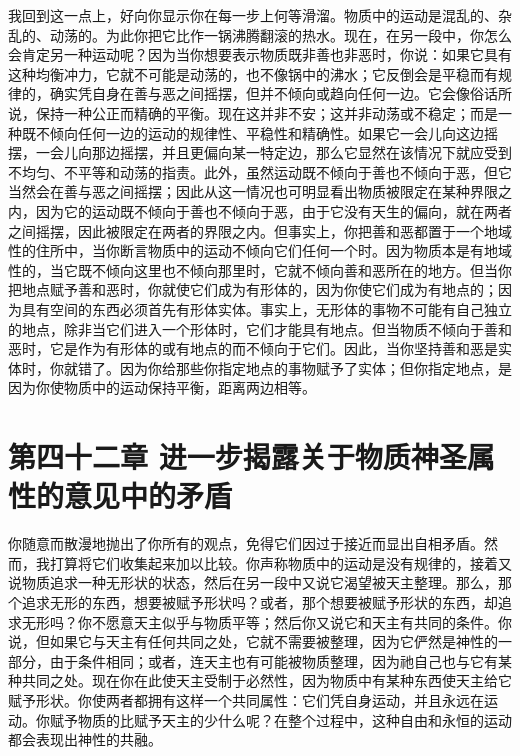 我回到这一点上，好向你显示你在每一步上何等滑溜。物质中的运动是混乱的、杂乱的、动荡的。为此你把它比作一锅沸腾翻滚的热水。现在，在另一段中，你怎么会肯定另一种运动呢？因为当你想要表示物质既非善也非恶时，你说：如果它具有这种均衡冲力，它就不可能是动荡的，也不像锅中的沸水；它反倒会是平稳而有规律的，确实凭自身在善与恶之间摇摆，但并不倾向或趋向任何一边。它会像俗话所说，保持一种公正而精确的平衡。现在这并非不安；这并非动荡或不稳定；而是一种既不倾向任何一边的运动的规律性、平稳性和精确性。如果它一会儿向这边摇摆，一会儿向那边摇摆，并且更偏向某一特定边，那么它显然在该情况下就应受到不均匀、不平等和动荡的指责。此外，虽然运动既不倾向于善也不倾向于恶，但它当然会在善与恶之间摇摆；因此从这一情况也可明显看出物质被限定在某种界限之内，因为它的运动既不倾向于善也不倾向于恶，由于它没有天生的偏向，就在两者之间摇摆，因此被限定在两者的界限之内。但事实上，你把善和恶都置于一个地域性的住所中，当你断言物质中的运动不倾向它们任何一个时。因为物质本是有地域性的，当它既不倾向这里也不倾向那里时，它就不倾向善和恶所在的地方。但当你把地点赋予善和恶时，你就使它们成为有形体的，因为你使它们成为有地点的；因为具有空间的东西必须首先有形体实体。事实上，无形体的事物不可能有自己独立的地点，除非当它们进入一个形体时，它们才能具有地点。但当物质不倾向于善和恶时，它是作为有形体的或有地点的而不倾向于它们。因此，当你坚持善和恶是实体时，你就错了。因为你给那些你指定地点的事物赋予了实体；但你指定地点，是因为你使物质中的运动保持平衡，距离两边相等。\par


\section{第四十二章 进一步揭露关于物质神圣属性的意见中的矛盾}

你随意而散漫地抛出了你所有的观点，免得它们因过于接近而显出自相矛盾。然而，我打算将它们收集起来加以比较。你声称物质中的运动是没有规律的，接着又说物质追求一种无形状的状态，然后在另一段中又说它渴望被天主整理。那么，那个追求无形的东西，想要被赋予形状吗？或者，那个想要被赋予形状的东西，却追求无形吗？你不愿意天主似乎与物质平等；然后你又说它和天主有共同的条件。你说，但如果它与天主有任何共同之处，它就不需要被整理，因为它俨然是神性的一部分，由于条件相同；或者，连天主也有可能被物质整理，因为祂自己也与它有某种共同之处。现在你在此使天主受制于必然性，因为物质中有某种东西使天主给它赋予形状。你使两者都拥有这样一个共同属性：它们凭自身运动，并且永远在运动。你赋予物质的比赋予天主的少什么呢？在整个过程中，这种自由和永恒的运动都会表现出神性的共融。\par

